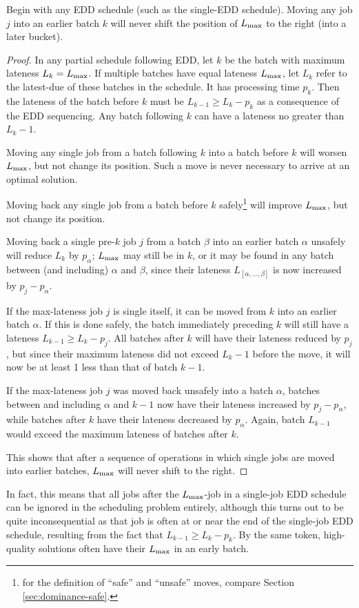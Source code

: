 \documentclass[13pt, letterpaper, oneside]{book}
\begin{document}
\begin{proposition}
Begin with any EDD schedule (such as the single-EDD schedule). Moving any job
$j$ into an earlier batch $k$ will never shift the position of $L_{\text{max}}$ to the
right (into a later bucket).

\begin{proof}
In any partial schedule following EDD, let $k$ be the batch
with maximum lateness $L_k = L_{\text{max}}$. If multiple batches have equal lateness
$L_{\text{max}}$, let $L_k$ refer to the latest-due of these batches in the schedule. It has processing time $p_k$. Then the lateness of the
batch before $k$ must be $L_{k-1} \geq L_k - p_k$ as a consequence of the EDD
sequencing. Any batch following $k$ can have a lateness no greater than $L_k -
1$.

\begin{alist}
\item{Moving any single job from a batch following $k$ into a batch before $k$ will
worsen $L_{\text{max}}$, but not change its position. Such a move is never necessary to
arrive at an optimal solution.}
\item{Moving back any single job from a
batch before $k$ safely\footnote{for the definition of ``safe'' and
``unsafe'' moves, compare Section \ref{sec:dominance-safe}.} will improve $L_{\text{max}}$,
but not change its position.}
\item{Moving back a single pre-$k$ job $j$ from a batch
$\beta$ into an earlier batch $\alpha$ unsafely will reduce $L_k$ by
$p_\alpha$; $L_{\text{max}}$ may still be in $k$, or it may be found in any batch between
(and including) $\alpha$ and $\beta$, since their lateness
$L_{[\alpha,\dots,\beta]}$ is now increased by $p_j - p_\alpha$.}
\item{If the
max-lateness job $j$ is single itself, it can be moved from $k$ into an earlier
batch $\alpha$. If this is done safely, the batch immediately preceding
$k$ will still have a lateness $L_{k-1} \geq L_k - p_j$. All batches after $k$
will have their lateness reduced by $p_j$, but since their maximum lateness did
not exceed $L_k - 1$ before the move, it will now be at least 1 less than that
of batch $k-1$.}
\item{If the max-lateness job
$j$ was moved back unsafely into a batch $\alpha$, batches between and
including $\alpha$ and $k-1$ now have their lateness increased by $p_j - p_\alpha$,
while batches after $k$ have their lateness decreased by $p_\alpha$. Again,
batch $L_{k-1}$ would exceed the maximum lateness of batches after $k$.}
\end{alist}
This shows that after a sequence of operations in which single jobs are moved into
earlier batches, $L_{\text{max}}$ will never shift to the right. 
\end{proof}
\end{proposition}
In fact, this means that all jobs after the $L_{\text{max}}$-job in a single-job EDD
schedule can be ignored in the scheduling problem entirely, although this turns
out to be quite inconsequential as that job is often at or near the end of the
single-job EDD schedule, resulting from the fact that $L_{k-1} \geq L_k - p_k$.
By the same token, high-quality solutions often have their $L_{\text{max}}$ in an early
batch.
\end{document}
